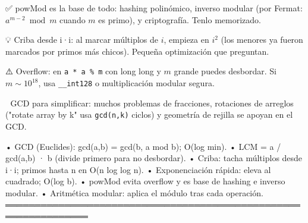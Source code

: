 \begin{dsaentrevistas}

✅ powMod es la base de todo: hashing polinómico, inverso modular (por
   Fermat: $a^{m-2} \bmod m$ cuando $m$ es primo), y criptografía. Tenlo
   memorizado.

💡 Criba desde i·i: al marcar múltiplos de $i$, empieza en $i^2$ (los
   menores ya fueron marcados por primos más chicos). Pequeña
   optimización que preguntan.

⚠️ Overflow: en \verb|a * a % m| con long long y $m$ grande puedes
   desbordar. Si $m \sim 10^{18}$, usa \verb|__int128| o multiplicación
   modular segura.

🔑 GCD para simplificar: muchos problemas de fracciones, rotaciones de
   arreglos ("rotate array by k" usa \verb|gcd(n,k)| ciclos) y geometría
   de rejilla se apoyan en el GCD.

\end{dsaentrevistas}

\begin{dsaresumen}

• GCD (Euclides): gcd(a,b) = gcd(b, a mod b); O(log min).
• LCM = a / gcd(a,b) · b (divide primero para no desbordar).
• Criba: tacha múltiplos desde i·i; primos hasta n en O(n log log n).
• Exponenciación rápida: eleva al cuadrado; O(log b).
• powMod evita overflow y es base de hashing e inverso modular.
• Aritmética modular: aplica el módulo tras cada operación.
════════════════════════════════════════════════════════════════

\end{dsaresumen}
